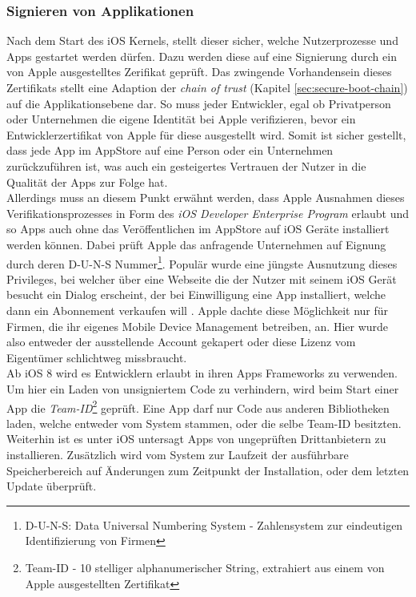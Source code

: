 	\subsubsection{Signieren von Applikationen}\label{sec:appsigning}
		Nach dem Start des iOS Kernels, stellt dieser sicher, welche Nutzerprozesse
		und Apps gestartet werden dürfen. Dazu werden diese auf eine Signierung durch
		ein von Apple ausgestelltes Zerifikat geprüft. Das zwingende Vorhandensein
		dieses Zertifikats stellt eine Adaption der \textsl{chain of trust} (Kapitel
		\ref{sec:secure-boot-chain}) auf die Applikationsebene dar. So muss jeder
		Entwickler, egal ob Privatperson oder Unternehmen die eigene Identität
		bei Apple verifizieren, bevor ein Entwicklerzertifikat von Apple für diese
		ausgestellt wird. Somit ist sicher gestellt, dass jede App im AppStore auf 
		eine Person oder ein Unternehmen zurückzuführen ist, was auch ein
		gesteigertes Vertrauen der Nutzer in die Qualität der Apps zur Folge hat.\\
		Allerdings muss an diesem Punkt erwähnt werden, dass Apple Ausnahmen dieses
		Verifikationsprozesses in Form des \textsl{iOS Developer Enterprise
		Program}\cite{AppleDevProg2015}
		erlaubt und so Apps auch ohne das Veröffentlichen im AppStore auf iOS Geräte
		installiert werden können. Dabei prüft Apple das anfragende Unternehmen auf
		Eignung durch deren D-U-N-S Nummer\footnote{D-U-N-S: Data Universal Numbering
		System - Zahlensystem zur eindeutigen Identifizierung von Firmen}. Populär wurde eine jüngste Ausnutzung dieses
		Privileges, bei welcher über eine Webseite die der Nutzer mit seinem iOS
		Gerät besucht ein Dialog erscheint, der bei Einwilligung eine App
		installiert, welche dann ein Abonnement verkaufen will
		\cite{HeiseCheatApp2015}. Apple dachte diese Möglichkeit nur für Firmen, die
		ihr eigenes Mobile Device Management betreiben, an. Hier wurde also entweder
		der ausstellende Account gekapert oder diese Lizenz vom Eigentümer
		schlichtweg missbraucht.\\
		Ab iOS 8 wird es Entwicklern erlaubt in ihren Apps Frameworks zu verwenden. Um
		hier ein Laden von unsigniertem Code zu verhindern, wird beim Start einer App
		die \textsl{Team-ID}\footnote{Team-ID - 10 stelliger
		alphanumerischer String, extrahiert aus einem von Apple ausgestellten
		Zertifikat} geprüft. Eine App darf nur Code aus anderen Bibliotheken laden,
		welche entweder vom System stammen, oder die selbe Team-ID besitzten.
		Weiterhin ist es unter iOS untersagt Apps von ungeprüften Drittanbietern zu
		installieren. Zusätzlich wird vom System zur Laufzeit der ausführbare
		Speicherbereich auf Änderungen zum Zeitpunkt der Installation, oder dem
		letzten Update überprüft.
		
